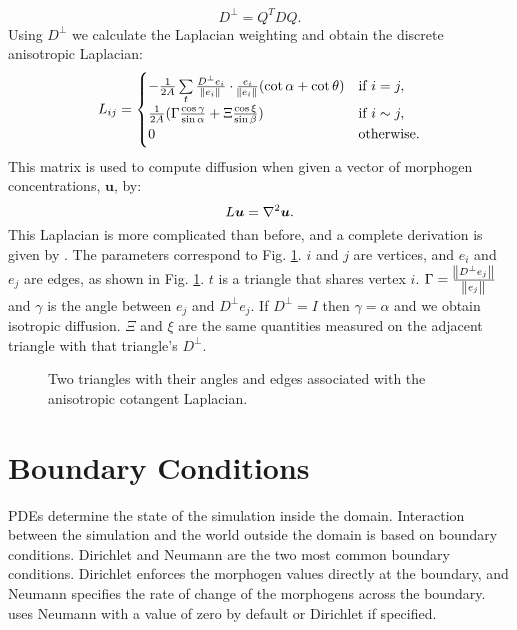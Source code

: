 \begin{equation} 
	D^\perp = Q^T D Q.
\label{eq:perpTensor}
\end{equation}
Using $D^\perp$ we calculate the Laplacian weighting and obtain the discrete anisotropic Laplacian:
\begin{equation} 
   L_{ij} =
   \begin{cases} 
      -\frac{1}{2A}\sum\limits_{t} \frac{D^\perp e_i}{\norm{e_i}} \cdot \frac{e_i}{\norm{e_i}}(\cot{\alpha}+\cot{\theta})  & \text{if } i = j, \\
      \frac{1}{2A}(\Gamma \frac{\cos{\gamma}}{\sin{\alpha}} + \Xi\frac{\cos{\xi}}{\sin{\beta}})                                     & \text{if } i \sim j, \\
      0 & \text{otherwise.}
   \end{cases}
   \label{eq:anisoLaplacian}
\end{equation}
This matrix is used to compute diffusion when given a vector of morphogen concentrations, $\bm{u}$, by:
\begin{equation}
	L\bm{u} = \nabla^2 \bm{u}.
\end{equation}
This Laplacian is more complicated than before, and a complete derivation is given by \citet{mathieu2014}. The parameters correspond to Fig. \ref{fig:meshLaplacian}. $i$ and $j$ are vertices, and $e_i$ and $e_j$ are edges, as shown in Fig. \ref{fig:meshLaplacian}. $t$ is a triangle that shares vertex $i$. $\Gamma = \frac{\norm{D^\perp e_j}}{\norm{e_j}}$ and $\gamma$ is the angle between $e_j$ and $D^\perp e_j$. If $D^{\perp} = I$ then $\gamma = \alpha$ and we obtain isotropic diffusion. $\Xi$ and $\xi$ are the same quantities measured on the adjacent triangle with that triangle's $D^\perp$. 

\begin{figure}[H]
	\centering
	\caption[Two triangles with their angles and edges associated with the anisotropic cotangent Laplacian]{Two triangles with their angles and edges associated with the anisotropic cotangent Laplacian.}
	\label{fig:meshLaplacian}
\end{figure}

\section{Boundary Conditions}
PDEs determine the state of the simulation inside the domain. Interaction between the simulation and the world outside the domain is based on boundary conditions. Dirichlet and Neumann are the two most common boundary conditions. Dirichlet enforces the morphogen values directly at the boundary, and Neumann specifies the rate of change of the morphogens across the boundary. \ProgramName{} uses Neumann with a value of zero by default or Dirichlet if specified.

